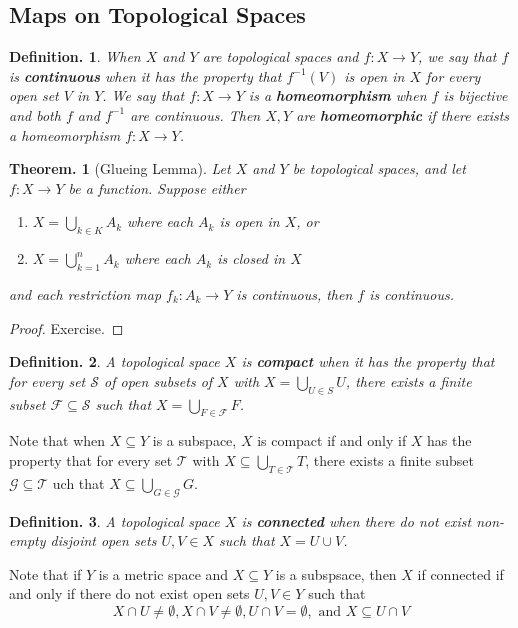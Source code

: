 \documentclass[11pt, a4paper]{memoir}
\theoremstyle{change}
\newtheorem{theorem}{Theorem.}[section]
\theoremstyle{plain}
\theoremstyle{nonumberplain}
\newtheorem{definition}{Definition.}
\newtheorem{proof}{Proof}
\numberwithin{equation}{section}
\begin{document}
\subsection{Maps on Topological Spaces}
\begin{definition}
    When $X$ and $Y$ are topological spaces and $f:X\to Y$, we say that $f$ is \textbf{continuous} when it has the property that $f^{-1}(V)$ is open in $X$ for every open set $V$ in $Y$.
    We say that $f:X\to Y$ is a \textbf{homeomorphism} when $f$ is bijective and both $f$ and $f^{-1}$ are continuous.
    Then $X,Y$ are \textbf{homeomorphic} if there exists a homeomorphism $f:X\to Y$.
\end{definition}
\begin{theorem}[Glueing Lemma]
    Let $X$ and $Y$ be topological spaces, and let $f:X\to Y$ be a function.
    Suppose either
    \begin{enumerate}[nl,r]
        \item $X=\bigcup_{k\in K}A_k$ where each $A_k$ is open in $X$, or
        \item $X=\bigcup_{k=1}^nA_k$ where each $A_k$ is closed in $X$
    \end{enumerate}
    and each restriction map $f_k:A_k\to Y$ is continuous, then $f$ is continuous.
\end{theorem}
\begin{proof}
    Exercise.
\end{proof}
\begin{definition}
    A topological space $X$ is \textbf{compact} when it has the property that for every set $\mathcal{S}$ of open subsets of $X$ with $X=\bigcup_{U\in S}U$, there exists a finite subset $\mathcal{F}\subseteq \mathcal{S}$ such that $X=\bigcup_{F\in\mathcal{F}}F$.
\end{definition}
Note that when $X\subseteq Y$ is a subspace, $X$ is compact if and only if $X$ has the property that for every set $\mathcal{T}$ with $X\subseteq\bigcup_{T\in\mathcal{T}}T$, there exists a finite subset $\mathcal{G}\subseteq\mathcal{T}$ uch that $X\subseteq\bigcup_{G\in\mathcal{G}}G$.
\begin{definition}
    A topological space $X$ is \textbf{connected} when there do not exist non-empty disjoint open sets $U,V\in X$ such that $X=U\cup V$.
\end{definition}
Note that if $Y$ is a metric space and $X\subseteq Y$ is a subspsace, then $X$ if connected if and only if there do not exist open sets $U,V\in Y$ such that
\begin{equation*}
    X\cap U\neq\emptyset, X\cap V\neq\emptyset, U\cap V=\emptyset,\text{ and }X\subseteq U\cap V
\end{equation*}
\end{document}
